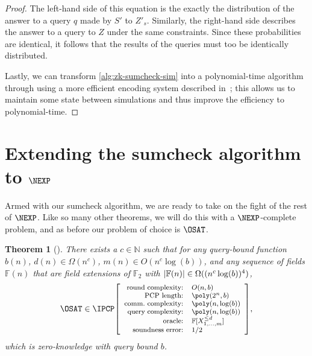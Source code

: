 \documentclass[english,12pt]{reedthesis}
\theoremstyle{plain}
\newtheorem{thm}{Theorem}[section]
\theoremstyle{definition}
\theoremstyle{remark}
\DeclarePairedDelimiter{\abs}{\lvert}{\rvert}
\newcommand{\ldipcp}[6]{%
  \ensuremath%
  \mleft[{\footnotesize\begin{array}{r l}
    \text{round complexity:} & #1 \\
    \text{PCP length:} & #2 \\
    \text{comm.\ complexity:} & #3 \\
    \text{query complexity:} & #4 \\
    \text{oracle:} & #5 \\
    \text{soundness error:} & #6
  \end{array}}\mright]%
}
\begin{document}
\begin{proof}
  The left-hand side of this equation is the exactly the distribution of the
  answer to a query $q$ made by $S'$ to $Z'_{s}$. Similarly, the right-hand side
  describes the answer to a query to $Z$ under the same constraints. Since these
  probabilities are identical, it follows that the results of the queries must
  too be identically distributed.

  Lastly, we can transform \cref{alg:zk-sumcheck-sim} into a polynomial-time
  algorithm through using a more efficient encoding system described
  in~\cite{BCFGRS17}; this allows us to maintain some state between simulations
  and thus improve the efficiency to polynomial-time.
\end{proof}

\section{Extending the sumcheck algorithm to $\NEXP$}

Armed with our sumcheck algorithm, we are ready to take on the fight of the rest
of $\NEXP$. Like so many other theorems, we will do this with a $\NEXP$-complete
problem, and as before our problem of choice is $\OSAT$.

\begin{thm}[{\cite[Thm.\ 14.2]{CFGS22}}]\label{thm:pzkipcp-for-nexp}
  There exists a $c \in \mathbb{N}$ such that for any query-bound function $b(n)$,
  $d(n) \in \Omega(n^{c})$, $m(n) \in O(n^{c}\log(b))$, and any sequence of fields
  $\mathbb{F}(n)$ that are field extensions of $\mathbb{F}_{2}$ with
  $\abs{\mathbb{F}(n)} \in \Omega((n^{c}\log(b))^{4})$,
  \begin{equation*}
    \OSAT \in \IPCP\ldipcp{O(n, b)}{\poly(2^{n}, b)}{\poly(n, \log(b))}{\poly(n, \log(b))}{\mathbb{F}[X_{1, \ldots, m}^{\le d}]}{1/2},
  \end{equation*}
  which is zero-knowledge with query bound $b$.
\end{thm}
\end{document}
